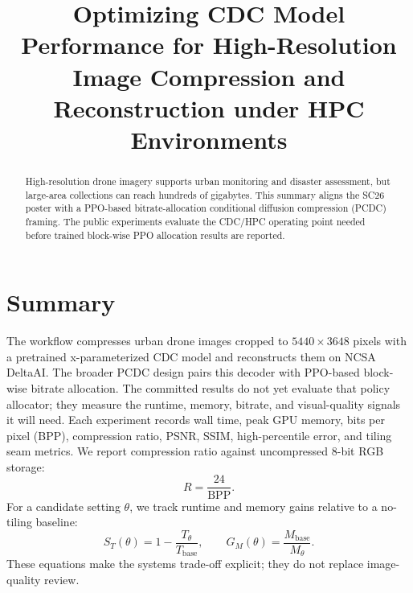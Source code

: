 \documentclass[conference]{IEEEtran}
\begin{document}
\title{Optimizing CDC Model Performance for High-Resolution Image Compression and Reconstruction under HPC Environments}

\author{
}

\maketitle

\begin{abstract}
High-resolution drone imagery supports urban monitoring and disaster assessment, but large-area collections can reach hundreds of gigabytes. This summary aligns the SC26 poster with a PPO-based bitrate-allocation conditional diffusion compression (PCDC) framing. The public experiments evaluate the CDC/HPC operating point needed before trained block-wise PPO allocation results are reported.
\end{abstract}

\section{Summary}

The workflow compresses urban drone images cropped to $5440 \times 3648$ pixels with a pretrained x-parameterized CDC model and reconstructs them on NCSA DeltaAI. The broader PCDC design pairs this decoder with PPO-based block-wise bitrate allocation. The committed results do not yet evaluate that policy allocator; they measure the runtime, memory, bitrate, and visual-quality signals it will need. Each experiment records wall time, peak GPU memory, bits per pixel (BPP), compression ratio, PSNR, SSIM, high-percentile error, and tiling seam metrics. We report compression ratio against uncompressed 8-bit RGB storage:
\begin{equation}
R=\frac{24}{\mathrm{BPP}}.
\end{equation}
For a candidate setting $\theta$, we track runtime and memory gains relative to a no-tiling baseline:
\begin{equation}
S_T(\theta)=1-\frac{T_\theta}{T_{\mathrm{base}}},
\qquad
G_M(\theta)=\frac{M_{\mathrm{base}}}{M_\theta}.
\end{equation}
These equations make the systems trade-off explicit; they do not replace image-quality review.
\end{document}
